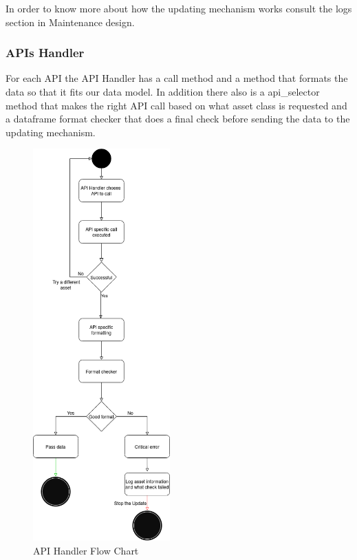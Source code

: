 \documentclass[main.tex]{subfiles}
\begin{document}
In order to know more about how the updating mechanism works consult the logs section in Maintenance design.


\subsubsection{APIs Handler}
For each API the API Handler has a call method and a method that formats the data so that it fits our data model. In addition there also is a api\_selector method that makes the right API call based on what asset class is requested and a dataframe format checker that does a final check before sending the data to the updating mechanism. 


\begin{figure}[H]
    \centering
    \caption{API Handler Flow Chart\cite{TR}}
	\includegraphics[width=0.47\textwidth]{04Design/04Pictures/api_handler_v2.png}
\end{figure}
\end{document}
